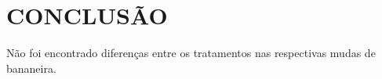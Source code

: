 \chapter{CONCLUSÃO}
Não foi encontrado diferenças entre os tratamentos nas respectivas mudas de bananeira.